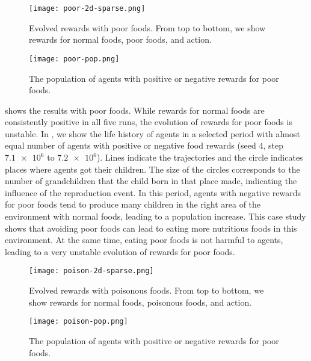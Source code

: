 \begin{figure}[t]
  \centering
  \texttt{[image: poor-2d-sparse.png]}
  \caption{
    Evolved rewards with poor foods.
    From top to bottom, we show rewards for normal foods, poor foods, and action.
  }\label{figure:result-poor}
\end{figure}

\begin{figure}[t]
  \centering
  \texttt{[image: poor-pop.png]}
  \caption{
    The population of agents with positive or negative rewards for poor foods.
  }\label{figure:pop-poor}
\end{figure}

 shows the results with poor foods. While rewards for normal foods are consistently positive in all five runs, the evolution of rewards for poor foods is unstable. In , we show the life history of agents in a selected period with almost equal number of agents with positive or negative food rewards (seed $4$, step $\num{7.1e6}$ to $\num{7.2e6}$). Lines indicate the trajectories and the circle indicates places where agents got their children. The size of the circles corresponds to the number of grandchildren that the child born in that place made, indicating the influence of the reproduction event. In this period, agents with negative rewards for poor foods tend to produce many children in the right area of the environment with normal foods, leading to a population increase. This case study shows that avoiding poor foods can lead to eating more nutritious foods in this environment. At the same time, eating poor foods is not harmful to agents, leading to a very unstable evolution of rewards for poor foods.

\begin{figure}[!ht]
  \centering
  \texttt{[image: poison-2d-sparse.png]}
  \caption{
    Evolved rewards with poisonous foods.
    From top to bottom, we show rewards for normal foods, poisonous foods, and action.
  }\label{figure:result-poison}
\end{figure}

\begin{figure}[t]
  \centering
  \texttt{[image: poison-pop.png]}
  \caption{
    The population of agents with positive or negative rewards for poor foods.
  }\label{figure:poison-pop}
\end{figure}

